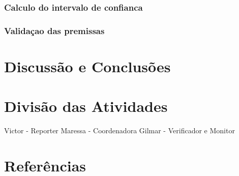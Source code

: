 \documentclass[]{article}
\begin{document}
\hypertarget{calculo-do-intervalo-de-confianca-1}{%
\subsubsection{Calculo do intervalo de
confianca}\label{calculo-do-intervalo-de-confianca-1}}

\hypertarget{validacao-das-premissas-2}{%
\subsubsection{Validaçao das
premissas}\label{validacao-das-premissas-2}}

\hypertarget{discussao-e-conclusoes}{%
\section{Discussão e Conclusões}\label{discussao-e-conclusoes}}

\hypertarget{divisao-das-atividades}{%
\section{Divisão das Atividades}\label{divisao-das-atividades}}

Victor - Reporter Maressa - Coordenadora Gilmar - Verificador e Monitor

\hypertarget{referencias}{%
\section{Referências}\label{referencias}}
\end{document}
